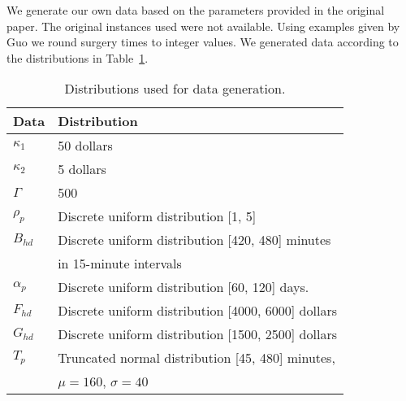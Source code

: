 We generate our own data based on the parameters provided in the original paper. The original instances used were not available. Using examples given by Guo\cite{guo} we round surgery times to integer values. We generated data according to the distributions in Table~\ref{tab:dataDist}.

\begin{table}[H]
    \centering
    \caption{Distributions used for data generation.}
    \label{tab:dataDist}
    \begin{tabular}{ll} \toprule
        Data & Distribution \\\midrule
        $\kappa_1$ & 50 dollars \\
        $\kappa_2$ & 5 dollars \\
        $\Gamma$ & 500 \\
        $\rho_p$ & Discrete uniform distribution [1, 5] \\
        $B_{hd}$ & Discrete uniform distribution [420, 480] minutes  \\
        & \quad in 15-minute intervals \\
        $\alpha_p$ & Discrete uniform distribution [60, 120] days. \\
        $F_{hd}$ & Discrete uniform distribution [4000, 6000] dollars \\
        $G_{hd}$ & Discrete uniform distribution [1500, 2500] dollars \\
        $T_p$ & 
            Truncated normal distribution [45, 480] minutes, \\
        & \quad $\mu=160$, $\sigma=40$
         \\
        \bottomrule
    \end{tabular}
\end{table}